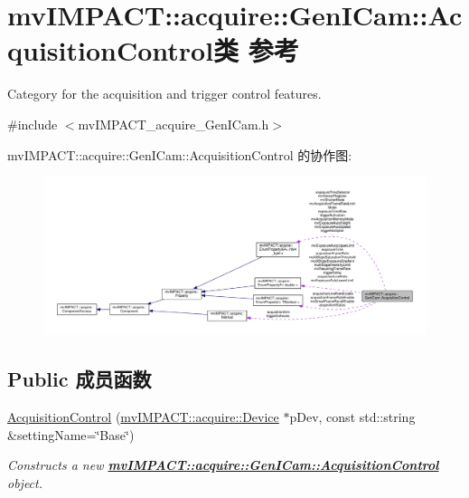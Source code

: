 \hypertarget{classmv_i_m_p_a_c_t_1_1acquire_1_1_gen_i_cam_1_1_acquisition_control}{\section{mv\+I\+M\+P\+A\+C\+T\+:\+:acquire\+:\+:Gen\+I\+Cam\+:\+:Acquisition\+Control类 参考}
\label{classmv_i_m_p_a_c_t_1_1acquire_1_1_gen_i_cam_1_1_acquisition_control}
}


Category for the acquisition and trigger control features.  




{\ttfamily \#include $<$mv\+I\+M\+P\+A\+C\+T\+\_\+acquire\+\_\+\+Gen\+I\+Cam.\+h$>$}



mv\+I\+M\+P\+A\+C\+T\+:\+:acquire\+:\+:Gen\+I\+Cam\+:\+:Acquisition\+Control 的协作图\+:
\nopagebreak
\begin{figure}[H]
\begin{center}
\leavevmode
\includegraphics[width=350pt]{classmv_i_m_p_a_c_t_1_1acquire_1_1_gen_i_cam_1_1_acquisition_control__coll__graph}
\end{center}
\end{figure}
\subsection*{Public 成员函数}
\begin{DoxyCompactItemize}
\item 
\hyperlink{classmv_i_m_p_a_c_t_1_1acquire_1_1_gen_i_cam_1_1_acquisition_control_a66a96d4ef8ec636ed0830bb8e5c94ca8}{Acquisition\+Control} (\hyperlink{classmv_i_m_p_a_c_t_1_1acquire_1_1_device}{mv\+I\+M\+P\+A\+C\+T\+::acquire\+::\+Device} $\ast$p\+Dev, const std\+::string \&setting\+Name=\char`\"{}Base\char`\"{})
\begin{DoxyCompactList}\small\item\em Constructs a new {\bfseries \hyperlink{classmv_i_m_p_a_c_t_1_1acquire_1_1_gen_i_cam_1_1_acquisition_control}{mv\+I\+M\+P\+A\+C\+T\+::acquire\+::\+Gen\+I\+Cam\+::\+Acquisition\+Control}} object. \end{DoxyCompactList}\end{DoxyCompactItemize}
